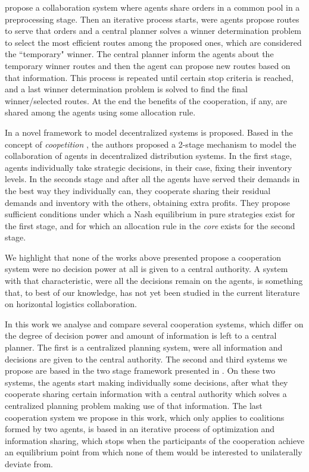 \documentclass{article}
\begin{document}
\textcite{WANG2014} propose a collaboration system where agents share orders in a common pool in a preprocessing stage. Then an iterative process starts, were agents propose routes to serve that orders and a central planner solves a winner determination problem to select the most efficient routes among the proposed ones, which are considered the ``temporary" winner. The central planner inform the agents about the temporary winner routes and then the agent can propose new routes based on that information. This process is repeated until certain stop criteria is reached, and a last winner determination problem is solved to find the final winner/selected routes. At the end the benefits of the cooperation, if any, are shared among the agents using some allocation rule.

In \textcite{ANUPINDI2001} a novel framework to model decentralized systems is proposed. Based in the concept of \emph{coopetition} \parencite{BRANDENBURGER1996},
the authors proposed a 2-stage mechanism to model the collaboration of agents in
decentralized distribution systems. In the first stage, agents individually
take strategic decisions, in their case, fixing their inventory levels. In the
seconds stage and after all the agents have served their demands in the best way they individually can, they cooperate sharing their residual demands and inventory with the others, obtaining extra profits. They propose sufficient conditions under which a Nash equilibrium in pure strategies exist for the first stage, and for which an allocation rule in the \emph{core} exists for the second stage.

We highlight that none of the works above presented propose a cooperation system were no decision power at all is given to a central authority. A system with that characteristic, were all the decisions remain on the agents, is something that, to best of our knowledge, has not yet been studied in the current literature on horizontal logistics collaboration.


In this work we analyse and compare several cooperation systems, which differ on the degree of decision power and amount of information is left to a central planner. The first is a centralized planning system, were all information and decisions are given to the central authority. The second and third systems we propose are based in the two stage framework presented in  \textcite{ANUPINDI2001}. On these two systems, the agents start  making individually some decisions, after what they cooperate sharing certain information with a central authority which solves a centralized planning problem making use of that information. The last cooperation system we propose in this work, which only applies to coalitions formed by two agents, is based in an iterative process of optimization and information sharing, which stops when the participants of the cooperation achieve an equilibrium point from which none of them would be interested to unilaterally deviate from. 
\end{document}
